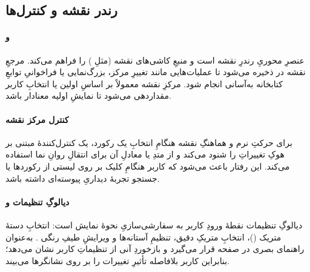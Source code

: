 \subsection{رندر نقشه و کنترل‌ها}
\paragraph{ و }
 عنصرِ محوریِ رندرِ نقشه است و  منبعِ کاشی‌های نقشه (مثلِ ) را فراهم می‌کند. مرجعِ نقشه در  ذخیره می‌شود تا عملیات‌هایی مانند تغییرِ مرکز، بزرگ‌نمایی یا فراخوانیِ توابعِ کتابخانه به‌آسانی انجام شود. مرکزِ نقشه معمولاً بر اساسِ اولین  یا انتخابِ کاربر مقداردهی می‌شود تا نمایشِ اولیه معنادار باشد.

\paragraph{کنترل مرکز نقشه}
برای حرکتِ نرم و هماهنگِ نقشه هنگامِ انتخابِ یک رکورد، یک کنترل‌کنندهٔ مبتنی بر هوکِ  تغییراتِ  را شنود می‌کند و از متدِ  یا معادلِ آن برای انتقالِ روانِ نما استفاده می‌کند. این رفتار باعث می‌شود که کاربر هنگامِ کلیک بر روی لیستی از رکوردها یا جستجو تجربهٔ دیداریِ پیوسته‌ای داشته باشد.

\paragraph{دیالوگِ تنظیمات و }
دیالوگِ تنظیمات نقطهٔ ورودِ کاربر به سفارشی‌سازیِ نحوهٔ نمایش است: انتخابِ دستهٔ متریک ()، انتخابِ متریکِ دقیق، تنظیمِ آستانه‌ها و ویرایشِ طیفِ رنگی .  به‌عنوان راهنمای بصری در صفحه قرار می‌گیرد و بازخوردِ آنی از تنظیماتِ کاربر نشان می‌دهد؛ بنابراین کاربر بلافاصله تأثیرِ تغییرات را بر روی نشانگرها می‌بیند.

